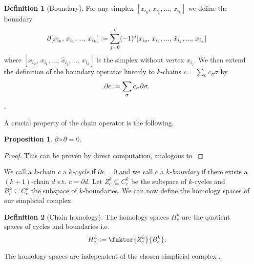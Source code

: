 \documentclass[12pt,a4paper]{article}
\newtheorem{proposition}{Proposition}
\theoremstyle{definition}
\newtheorem{definition}{Definition}
\begin{document}
\begin{definition}[Boundary]
    For any simplex $[x_{i_0},\, x_{i_1},...,\, x_{i_k}]$ we define the boundary
    \begin{align*}
        \partial[x_{i_0},\, x_{i_1},...,\, x_{i_k}] \vcentcolon=
        \sum\limits_{j=0}^k (-1)^j [x_{i_0},\, x_{i_1},...,\, 
        \hat{x}_{i_j},...,\, x_{i_k}]
    \end{align*}
    where $[x_{i_0},\, x_{i_1},...,\, \hat{x}_{i_j},...,\, x_{i_k}]$ is the
    simplex without vertex $x_{i_j}$. We then extend the definition
    of the boundary operator linearly to $k$-chains 
    $c = \sum_\sigma c_\sigma \sigma$ by
    \begin{align*}
        \partial c \vcentcolon= \sum\limits_\sigma c_\sigma \partial \sigma.
    \end{align*}.
\end{definition}

A crucial property of the chain operator is the following.

\begin{proposition}
    $\partial \circ \partial = 0$.
\end{proposition}
\begin{proof}
    This can be proven by direct computation, analogous to 
    \cite[Chap.4, Lemma 1.6]{topology_and_geometry}
\end{proof}

We call a $k$-chain $c$ a \textit{$k$-cycle} if $\partial c = 0$ and we call $c$ 
a \textit{$k$-boundary} if there exists a $(k+1)$-chain $d$ s.t. 
$c = \partial d$. Let $Z^k_c \subseteq C^k_c$ be the subspace of $k$-cycles
and $B^k_c \subseteq C^k_c$ the subspace of $k$-boundaries.
We can now define the homology spaces of our simplicial complex.

\begin{definition}[Chain homology]
    The homology spaces $H^k_c$ are the quotient spaces of 
    cycles and boundaries i.e.
    \begin{align*}
        H^k_c\vcentcolon= \faktor{Z^k_c}{B^k_c}.
    \end{align*}
\end{definition}
\noindent The homology spaces are independent of the chosen simplicial complex
\cite{}. %
\end{document}

